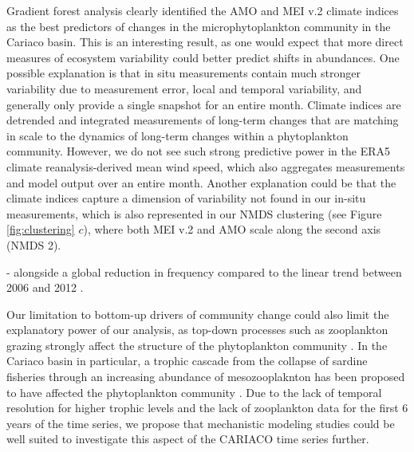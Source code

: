 Gradient forest analysis clearly identified the AMO and MEI v.2 climate indices as the best predictors of changes in the microphytoplankton community in the Cariaco basin. This is an interesting result, as one would expect that more direct measures of ecosystem variability could better predict shifts in abundances. One possible explanation is that in situ measurements contain much stronger variability due to measurement error, local and temporal variability, and generally only provide a single snapshot for an entire month. Climate indices are detrended and integrated measurements of long-term changes that are matching in scale to the dynamics of long-term changes within a phytoplankton community. However, we do not see such strong predictive power in the ERA5 climate reanalysis-derived mean wind speed, which also aggregates measurements and model output over an entire month. 
Another explanation could be that the climate indices capture a dimension of variability not found in our in-situ measurements, which is also represented in our NMDS clustering (see Figure \ref{fig:clustering} $c$), where both MEI v.2 and AMO scale along the second axis (NMDS 2). %



- alongside a global reduction in frequency compared to the linear trend between 2006 and 2012 \cite{dai_coastal_2023}. %


Our limitation to bottom-up drivers of community change could also limit the explanatory power of our analysis, as top-down processes such as zooplankton grazing strongly affect the structure of the phytoplankton community \cite{banas_adding_2011, acevedo-trejos_mechanisms_2015}. In the Cariaco basin in particular, a trophic cascade from the collapse of sardine fisheries through an increasing abundance of mesozooplaknton has been proposed to have affected the phytoplankton community \cite{muller-karger_scientific_2019}. Due to the lack of temporal resolution for higher trophic levels and the lack of zooplankton data for the first 6 years of the time series, we propose that mechanistic modeling studies could be well suited to investigate this aspect of the CARIACO time series further.

